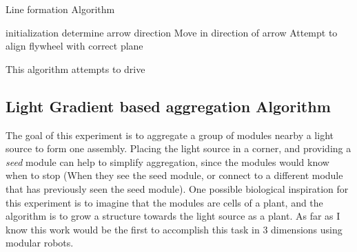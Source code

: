 \begin{algorithm}[ht] 
	\caption{Line formation Algorithm}
	\label{algorithmLine}
	\SetAlgoLined
	initialization\;
	{
		determine arrow direction\;
		{
			Move in direction of arrow\;
		}
		{
			Attempt to align flywheel with correct plane\;
		}
	}
	\caption{This algorithm attempts to drive }
	
\end{algorithm}


\subsection{Light Gradient based aggregation Algorithm}
\label{sec:algLight}
The goal of this experiment is to aggregate a group of modules nearby a light source to form one assembly. Placing the light source in a corner, and providing a \emph{seed} module can help to simplify aggregation, since the modules would know when to stop (When they see the seed module, or connect to a different module that has previously seen the seed module). One possible biological inspiration for this experiment is to imagine that the modules are cells of a plant, and the algorithm is to grow a structure towards the light source as a plant. As far as I know this work would be the first to accomplish this task in 3 dimensions using modular robots.

